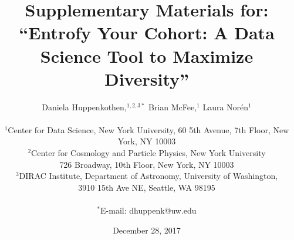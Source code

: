 \documentclass[12pt]{article}
\begin{document}

\title{Supplementary Materials for: ``Entrofy Your Cohort: A Data Science Tool to Maximize Diversity''} 




\author
{Daniela Huppenkothen,${}^{1,2,3\ast}$ Brian McFee,${}^{1}$ Laura Nor\'{e}n${}^{1}$\\
\\
\normalsize{${}^{1}$Center for Data Science, New York University, 60 5th Avenue, 7th Floor, New York, NY 10003}\\
\normalsize{${}^{2}$Center for Cosmology and Particle Physics, New York University}\\
\normalsize{726 Broadway, 10th Floor, New York, NY 10003}\\
\normalsize{${}^{3}$DIRAC Institute, Department of Astronomy, University of Washington,}\\
\normalsize{3910 15th Ave NE, Seattle, WA 98195}\\
\\
\normalsize{$^\ast$E-mail:  dhuppenk@uw.edu}
}




\date{December 28, 2017}%

\maketitle{}
\end{document}
